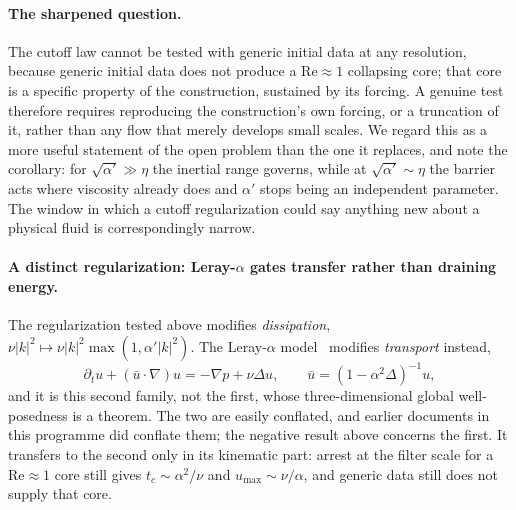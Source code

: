\documentclass[11pt,a4paper]{article}
\begin{document}
\paragraph{The sharpened question.} The cutoff law cannot be tested with generic initial data at
any resolution, because generic initial data does not produce a $\mathrm{Re}\approx1$ collapsing
core; that core is a specific property of the construction, sustained by its forcing. A genuine
test therefore requires reproducing the construction's own forcing, or a truncation of it, rather
than any flow that merely develops small scales. We regard this as a more useful statement of the
open problem than the one it replaces, and note the corollary: for $\sqrt{\alpha'}\gg\eta$ the
inertial range governs, while at $\sqrt{\alpha'}\sim\eta$ the barrier acts where viscosity already
does and $\alpha'$ stops being an independent parameter. The window in which a cutoff
regularization could say anything new about a physical fluid is correspondingly narrow.

\paragraph{A distinct regularization: Leray-$\alpha$ gates transfer rather than draining energy.}
The regularization tested above modifies \emph{dissipation},
$\nu|k|^2\mapsto\nu|k|^2\max(1,\alpha'|k|^2)$. The Leray-$\alpha$ model~\cite{FHT2001,CHOT2005}
modifies \emph{transport} instead,
\begin{equation}
  \partial_t u+(\bar u\cdot\nabla)u=-\nabla p+\nu\Delta u,\qquad
  \bar u=(1-\alpha^2\Delta)^{-1}u,
  \label{eq:leray-alpha}
\end{equation}
and it is this second family, not the first, whose three-dimensional global well-posedness is a
theorem. The two are easily conflated, and earlier documents in this programme did conflate them;
the negative result above concerns the first. It transfers to the second only in its kinematic
part: arrest at the filter scale for a $\mathrm{Re}\approx1$ core still gives $t_c\sim\alpha^2/\nu$
and $u_{\max}\sim\nu/\alpha$, and generic data still does not supply that core.
\end{document}
